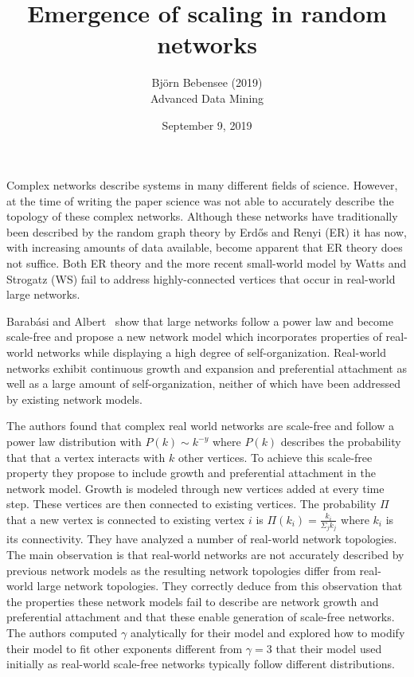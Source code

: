 \documentclass[12pt]{article}
\begin{document}
 
 
\title{Emergence of scaling in random networks}
\author{Bj\"orn Bebensee (2019)\\ %
Advanced Data Mining}
\date{September 9, 2019}
\maketitle

Complex networks describe systems in many different fields of science. However, at the time of writing the paper science was not able to accurately describe the topology of these complex networks. Although these networks have traditionally been described by the random graph theory by Erdős and Renyi (ER) it has now, with increasing amounts of data available, become apparent that ER theory does not suffice. Both ER theory and the more recent small-world model by Watts and Strogatz (WS) fail to address highly-connected vertices that occur in real-world large networks.

Barabási and Albert~\cite{barabasi} show that large networks follow a power law and become scale-free and propose a new network model which incorporates properties of real-world networks while displaying a high degree of self-organization. Real-world networks exhibit continuous growth and expansion and preferential attachment as well as a large amount of self-organization, neither of which have been addressed by existing network models.

The authors found that complex real world networks are scale-free and follow a power law distribution with $P(k) \sim k^{-y}$ where $P(k)$ describes the probability that that a vertex interacts with $k$ other vertices. To achieve this scale-free property they propose to include growth and preferential attachment in the network model. Growth is modeled through new vertices added at every time step. These vertices are then connected to existing vertices. The probability $\Pi$ that a new vertex is connected to existing vertex $i$ is $\Pi(k_i) = \frac{k_i}{\Sigma_j k_j}$ where $k_i$ is its connectivity. They have analyzed a number of real-world network topologies. The main observation is that real-world networks are not accurately described by previous network models as the resulting network topologies differ from real-world large network topologies. They correctly deduce from this observation that the properties these network models fail to describe are network growth and preferential attachment and that these enable generation of scale-free networks. The authors computed $\gamma$ analytically for their model and explored how to modify their model to fit other exponents different from $\gamma = 3$ that their model used initially as real-world scale-free networks typically follow different distributions.
\end{document}
